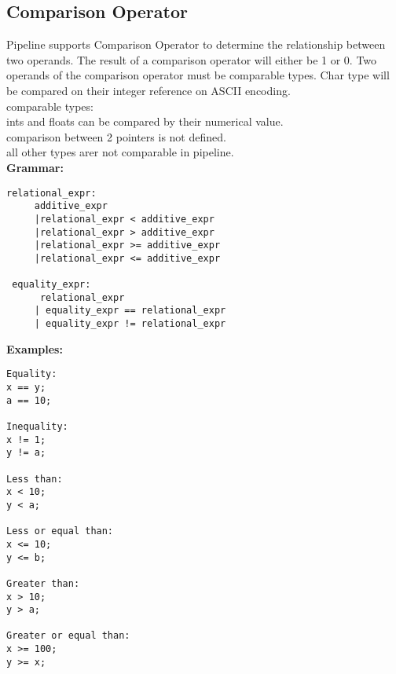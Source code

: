 \documentclass[./LRM_main.tex]{subfiles}
\begin{document}
\subsection{Comparison Operator}
Pipeline supports Comparison Operator to determine the relationship between two operands. The result of a comparison operator will either be 1 or 0. Two operands of the comparison operator must be comparable types. Char type will be compared on their integer reference on ASCII encoding.\\
comparable types:\\
ints and floats can be compared by their numerical value.\\
comparison between 2 pointers is not defined.\\
all other types arer not comparable in pipeline.\\
\vspace{1 mm}
\textbf{Grammar:}
\begin{lstlisting}
relational_expr:
     additive_expr
     |relational_expr < additive_expr
     |relational_expr > additive_expr
     |relational_expr >= additive_expr
     |relational_expr <= additive_expr

 equality_expr:
      relational_expr 
     | equality_expr == relational_expr
     | equality_expr != relational_expr

\end{lstlisting}
\vspace{1 mm}
\textbf{Examples:}
\begin{lstlisting}
Equality:
x == y;
a == 10;

Inequality:
x != 1;
y != a;

Less than:
x < 10;
y < a;

Less or equal than:
x <= 10;
y <= b;

Greater than:
x > 10;
y > a;

Greater or equal than:
x >= 100;
y >= x;

\end{lstlisting}
\end{document}
